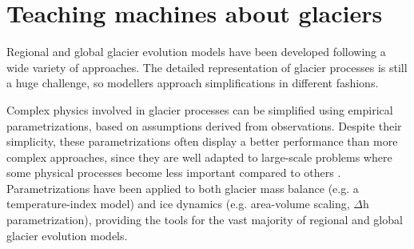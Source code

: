 \section{Teaching machines about glaciers}

Regional and global glacier evolution models have been developed following a wide variety of approaches. The detailed representation of glacier processes is still a huge challenge, so modellers approach simplifications in different fashions. 

Complex physics involved in glacier processes can be simplified using empirical parametrizations, based on assumptions derived from observations. Despite their simplicity, these parametrizations often display a better performance than more complex approaches, since they are well adapted to large-scale problems where some physical processes become less important compared to others \citep{reveillet_relative_2018}. Parametrizations have been applied to both glacier mass balance (e.g. a temperature-index model) and ice dynamics (e.g. area-volume scaling, $\Delta$h parametrization), providing the tools for the vast majority of regional and global glacier evolution models.

